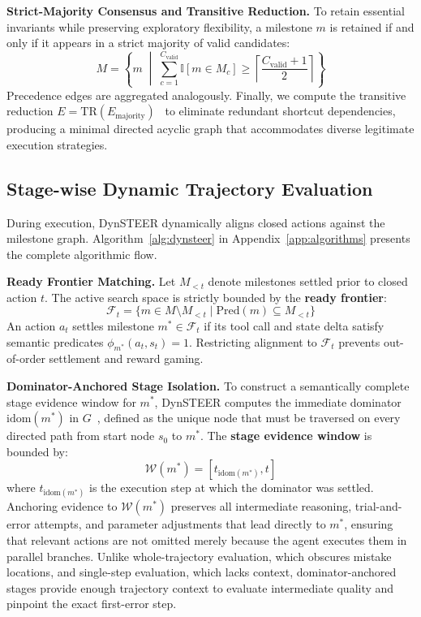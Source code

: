 \textbf{Strict-Majority Consensus and Transitive Reduction.} To retain essential invariants while preserving exploratory flexibility, a milestone $m$ is retained if and only if it appears in a strict majority of valid candidates:
\begin{equation}
    M = \left\{ m \;\middle|\; \sum_{c=1}^{C_{\text{valid}}} \mathbb{I}[m \in M_c] \ge \left\lceil \frac{C_{\text{valid}} + 1}{2} \right\rceil \right\}
    \label{eq:consensus}
\end{equation}
Precedence edges are aggregated analogously. Finally, we compute the transitive reduction $E = \text{TR}(E_{\text{majority}})$~\citep{tarjan1972depth} to eliminate redundant shortcut dependencies, producing a minimal directed acyclic graph that accommodates diverse legitimate execution strategies.

\subsection{Stage-wise Dynamic Trajectory Evaluation}
\label{sec:stage_alignment}
During execution, DynSTEER dynamically aligns closed actions against the milestone graph. Algorithm~\ref{alg:dynsteer} in Appendix~\ref{app:algorithms} presents the complete algorithmic flow.

\textbf{Ready Frontier Matching.} Let $M_{<t}$ denote milestones settled prior to closed action $t$. The active search space is strictly bounded by the \textbf{ready frontier}:
\begin{equation}
    \mathcal{F}_t = \{ m \in M \setminus M_{<t} \mid \text{Pred}(m) \subseteq M_{<t} \}
    \label{eq:frontier}
\end{equation}
An action $a_t$ settles milestone $m^* \in \mathcal{F}_t$ if its tool call and state delta satisfy semantic predicates $\phi_{m^*}(a_t, s_t) = 1$. Restricting alignment to $\mathcal{F}_t$ prevents out-of-order settlement and reward gaming.

\textbf{Dominator-Anchored Stage Isolation.} To construct a semantically complete stage evidence window for $m^*$, DynSTEER computes the immediate dominator $\text{idom}(m^*)$ in $G$~\citep{lengauer1979fast}, defined as the unique node that must be traversed on every directed path from start node $s_0$ to $m^*$. The \textbf{stage evidence window} is bounded by:
\begin{equation}
    \mathcal{W}(m^*) = [t_{\text{idom}(m^*)}, t]
    \label{eq:stage_window}
\end{equation}
where $t_{\text{idom}(m^*)}$ is the execution step at which the dominator was settled. 
Anchoring evidence to $\mathcal{W}(m^*)$ preserves all intermediate reasoning, trial-and-error attempts, and parameter adjustments that lead directly to $m^*$, ensuring that relevant actions are not omitted merely because the agent executes them in parallel branches.
Unlike whole-trajectory evaluation, which obscures mistake locations, and single-step evaluation, which lacks context, dominator-anchored stages provide enough trajectory context to evaluate intermediate quality and pinpoint the exact first-error step.

